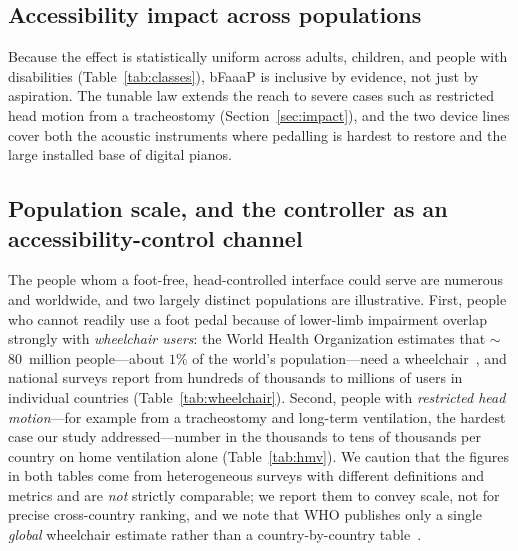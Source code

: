\subsection{Accessibility impact across populations}
Because the effect is statistically uniform across adults, children, and people
with disabilities (Table~\ref{tab:classes}), bFaaaP is inclusive by evidence, not
just by aspiration. The tunable law extends the reach to severe cases such as
restricted head motion from a tracheostomy (Section~\ref{sec:impact}), and the
two device lines cover both the acoustic instruments where pedalling is hardest to
restore and the large installed base of digital pianos.

\subsection{Population scale, and the controller as an accessibility-control channel}
\label{sec:access-channel}
The people whom a foot-free, head-controlled interface could serve are numerous and
worldwide, and two largely distinct populations are illustrative. First, people who
cannot readily use a foot pedal because of lower-limb impairment overlap strongly with
\emph{wheelchair users}: the World Health Organization estimates that $\sim$80~million
people---about $1\%$ of the world's population---need a wheelchair~\cite{who_wheelchair2023},
and national surveys report from hundreds of thousands to millions of users in individual
countries (Table~\ref{tab:wheelchair}). Second, people with \emph{restricted head
motion}---for example from a tracheostomy and long-term ventilation, the hardest case our
study addressed---number in the thousands to tens of thousands per country on home
ventilation alone (Table~\ref{tab:hmv}). We caution that the figures in both tables come
from heterogeneous surveys with different definitions and metrics and are \emph{not}
strictly comparable; we report them to convey scale, not for precise cross-country
ranking, and we note that WHO publishes only a single \emph{global} wheelchair estimate
rather than a country-by-country table~\cite{who_great2022}.

